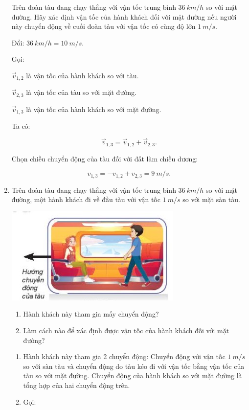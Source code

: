 \begin{enumerate}[label=\bfseries Bài \arabic*:,leftmargin=1.5cm]
	
	{   
		Trên đoàn tàu đang chạy thẳng với vận tốc trung bình $\SI{36}{km/h}$ so với mặt đường. Hãy xác định vận tốc của hành khách đối với mặt đường nếu người này chuyển động về cuối đoàn tàu với vận tốc có cùng độ lớn $\SI{1}{m/s}$.
	}
	\hideall
	{
		
		Đổi: $\SI{36}{km/h} = \SI{10}{m/s}$.
		
		Gọi:
		
		$\vec v_{1,2}$ là vận tốc của hành khách so với tàu.
		
		$\vec v_{2,3}$ là vận tốc của tàu so với mặt đường.
		
		$\vec v_{1,3}$ là vận tốc của hành khách so với mặt đường.
		
		Ta có:
		
		$$\vec v_{1,3} = \vec v_{1,2} + \vec v_{2,3}.$$
		
		Chọn chiều chuyển động của tàu đối với đất làm chiều dương:
		
		$$v_{1,3} = - v_{1,2} + v_{2,3} = \SI{9}{m/s}.$$
		
		
	}

	\item {}
	
	
	{
		Trên đoàn tàu đang chạy thẳng với vận tốc trung bình $\SI{36}{km/h}$ so với mặt đường, một hành khách đi về đầu tàu với vận tốc $\SI{1}{m/s}$ so với mặt sàn tàu.
		\begin{center}
			\includegraphics[scale=1]{../figs/VN10-2022-PH-TP005-3.jpg}
		\end{center}
		\begin{enumerate}[label=\alph*)]
			\item Hành khách này tham gia mấy chuyển động?
			\item Làm cách nào để xác định được vận tốc của hành khách đối với mặt đường?
		\end{enumerate}
	}
	\hideall
	{
		\begin{enumerate}[label=\alph*)]
			\item Hành khách này tham gia 2 chuyển động: Chuyển động với vận tốc $\SI{1}{m/s}$ so với sàn tàu và chuyển động do tàu kéo đi với vận tốc bằng vận tốc của tàu so với mặt đường. Chuyển động của hành khách so với mặt đường là tổng hợp của hai chuyển động trên.
			\item Gọi:
			

\end{enumerate}}
\end{enumerate}
